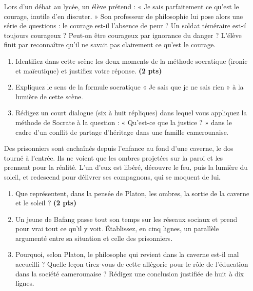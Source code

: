 \documentclass[11pt]{article}
\begin{document}
\begin{exercice}
Lors d'un débat au lycée, un élève prétend : « Je sais parfaitement ce qu'est le courage, inutile d'en discuter. » Son professeur de philosophie lui pose alors une série de questions : le courage est-il l'absence de peur ? Un soldat téméraire est-il toujours courageux ? Peut-on être courageux par ignorance du danger ? L'élève finit par reconnaître qu'il ne savait pas clairement ce qu'est le courage.
\begin{enumerate}
\item Identifiez dans cette scène les deux moments de la méthode socratique (ironie et maïeutique) et justifiez votre réponse. \textbf{(2 pts)}
\item Expliquez le sens de la formule socratique « Je sais que je ne sais rien » à la lumière de cette scène.
\item Rédigez un court dialogue (six à huit répliques) dans lequel vous appliquez la méthode de Socrate à la question : « Qu'est-ce que la justice ? » dans le cadre d'un conflit de partage d'héritage dans une famille camerounaise.
\end{enumerate}
\end{exercice}

\begin{exercice}
Des prisonniers sont enchaînés depuis l'enfance au fond d'une caverne, le dos tourné à l'entrée. Ils ne voient que les ombres projetées sur la paroi et les prennent pour la réalité. L'un d'eux est libéré, découvre le feu, puis la lumière du soleil, et redescend pour délivrer ses compagnons, qui se moquent de lui.
\begin{enumerate}
\item Que représentent, dans la pensée de Platon, les ombres, la sortie de la caverne et le soleil ? \textbf{(2 pts)}
\item Un jeune de Bafang passe tout son temps sur les réseaux sociaux et prend pour vrai tout ce qu'il y voit. Établissez, en cinq lignes, un parallèle argumenté entre sa situation et celle des prisonniers.
\item Pourquoi, selon Platon, le philosophe qui revient dans la caverne est-il mal accueilli ? Quelle leçon tirez-vous de cette allégorie pour le rôle de l'éducation dans la société camerounaise ? Rédigez une conclusion justifiée de huit à dix lignes.
\end{enumerate}
\end{exercice}
\end{document}

